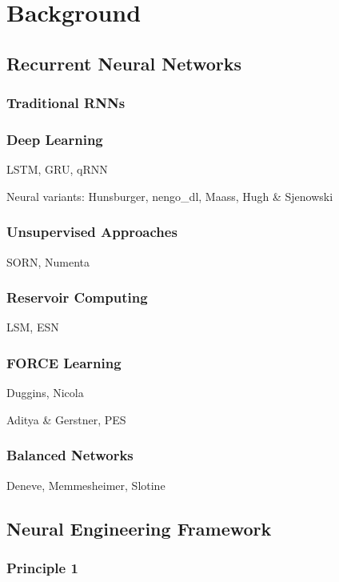 \chapter{Background}
\label{chapt:background}

\section{Recurrent Neural Networks}

\subsection{Traditional RNNs}

\subsection{Deep Learning}

LSTM, GRU, qRNN

Neural variants: Hunsburger, nengo\_dl, Maass, Hugh \& Sjenowski

\subsection{Unsupervised Approaches}

SORN, Numenta

\subsection{Reservoir Computing}

LSM, ESN

\subsection{FORCE Learning}

Duggins, Nicola

Aditya & Gerstner, PES

\subsection{Balanced Networks}

Deneve, Memmesheimer, Slotine


\section{Neural Engineering Framework}

\subsection{Principle 1}

